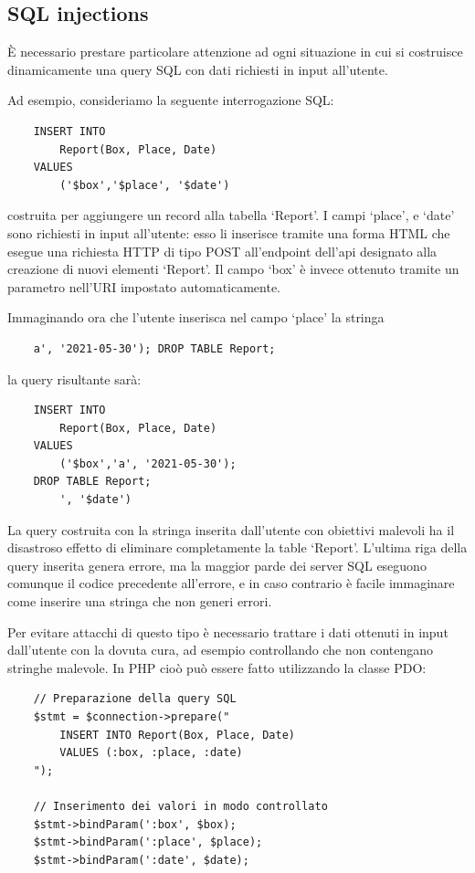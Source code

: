 \subsection{SQL injections}

È necessario prestare particolare attenzione ad ogni situazione in cui si costruisce dinamicamente una query SQL con dati richiesti in input all'utente.

Ad esempio, consideriamo la seguente interrogazione SQL:
\lstset{language=sql}
\begin{lstlisting}
    INSERT INTO
        Report(Box, Place, Date) 
    VALUES 
        ('$box','$place', '$date')
\end{lstlisting}
costruita per aggiungere un record alla tabella `Report'. I campi `\textdollar place', e `\textdollar date' sono richiesti in input all'utente: esso li inserisce tramite una forma HTML che esegue una richiesta HTTP di tipo POST all'endpoint dell'api designato alla creazione di nuovi elementi `Report'. Il campo `\textdollar box' è invece ottenuto tramite un parametro nell'URI impostato automaticamente.

Immaginando ora che l'utente inserisca nel campo `\textdollar place' la stringa
\begin{verbatim}
    a', '2021-05-30'); DROP TABLE Report;
\end{verbatim}
la query risultante sarà:
\lstset{language=sql, showstringspaces=false}
\begin{lstlisting}
    INSERT INTO
        Report(Box, Place, Date) 
    VALUES 
        ('$box','a', '2021-05-30'); 
    DROP TABLE Report;
        ', '$date')
\end{lstlisting}

La query costruita con la stringa inserita dall'utente con obiettivi malevoli ha il disastroso effetto di eliminare completamente la table `Report'. L'ultima riga della query inserita genera errore, ma la maggior parde dei server SQL eseguono comunque il codice precedente all'errore, e in caso contrario è facile immaginare come inserire una stringa che non generi errori.

Per evitare attacchi di questo tipo è necessario trattare i dati ottenuti in input dall'utente con la dovuta cura, ad esempio controllando che non contengano stringhe malevole. In PHP cioò può essere fatto utilizzando la classe PDO:
\lstset{language=php}
\begin{lstlisting}
    // Preparazione della query SQL
    $stmt = $connection->prepare("
        INSERT INTO Report(Box, Place, Date)
        VALUES (:box, :place, :date)
    ");

    // Inserimento dei valori in modo controllato
    $stmt->bindParam(':box', $box);
    $stmt->bindParam(':place', $place);
    $stmt->bindParam(':date', $date);    
\end{lstlisting}

